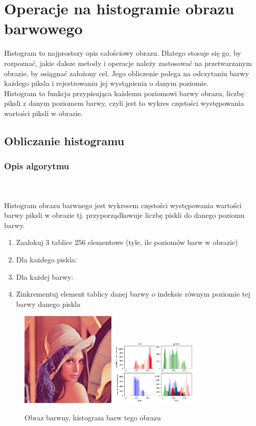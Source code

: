 \documentclass[final,a4paper,openany,12pt]{mwbk}
\begin{document}
\chapter{Operacje na histogramie obrazu barwowego}
Histogram to najprostszy opis całościowy obrazu. Dlatego stosuje się go, by rozpoznać, jakie dalsze metody i operacje należy zastosować na przetwarzanym obrazie, by osiągnać założony cel. Jego obliczenie polega na odczytaniu barwy każdego piksla i rejestrowaniu jej wystąpienia o danym poziomie.\\
Histogram to funkcja przypisująca każdemu poziomowi barwy obrazu, liczbę piksli z danym poziomem barwy, czyli jest to wykres częstości występowania wartości piksli w obrazie.
\newpage

\section{Obliczanie histogramu}
\subsection*{Opis algorytmu}
\hfill
\\\\
\indent Histogram obrazu barwnego jest wykresem częstości występowania wartości barwy piksli w obrazie tj.
przyporządkowuje liczbę piskli do danego poziomu barwy.\newline
\begin{enumerate}
	\item Zaalokuj 3 tablice 256 elementowe (tyle, ile poziomów barw w obrazie)
	\item Dla każdego piskla:
	\item Dla każdej barwy:
	\item Zinkrementuj element tablicy danej barwy o indeksie równym poziomie tej barwy danego piskla
\end{enumerate}

\begin{figure}[H]
	\begin{center}
		\includegraphics[width=0.4\textwidth]{lena_color}
		\includegraphics[width=0.4\textwidth]{lena_color_histogram}
	\end{center}
	\caption{Obraz barwny, histogram barw tego obrazu}
\end{figure}
\end{document}
